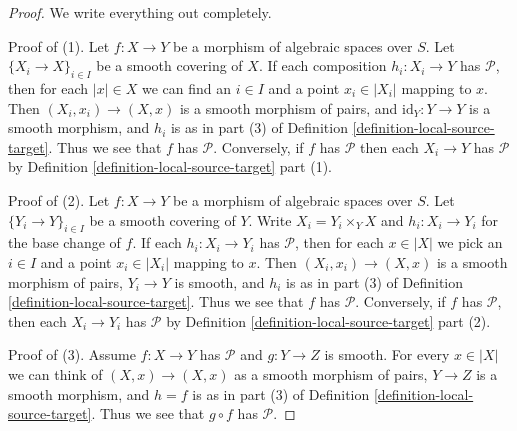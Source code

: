 \documentclass[10pt,a4paper]{amsart}
\theoremstyle{plain}
\theoremstyle{definition}
\theoremstyle{remark}
\numberwithin{equation}{subsection}
\begin{document}
\begin{proof}
We write everything out completely.

\medskip\noindent
Proof of (1). Let $f : X \to Y$ be a morphism of algebraic spaces over $S$.
Let $\{X_i \to X\}_{i \in I}$ be a smooth covering of $X$. If each composition
$h_i : X_i \to Y$ has $\mathcal{P}$, then for each $|x| \in X$ we can find
an $i \in I$ and a point $x_i \in |X_i|$ mapping to $x$. Then
$(X_i, x_i) \to (X, x)$ is a smooth morphism of pairs, and
$\text{id}_Y : Y \to Y$ is a smooth morphism, and $h_i$ is as in part (3) of
Definition \ref{definition-local-source-target}.
Thus we see that $f$ has $\mathcal{P}$.
Conversely, if $f$ has $\mathcal{P}$ then each $X_i \to Y$ has
$\mathcal{P}$ by
Definition \ref{definition-local-source-target} part (1).

\medskip\noindent
Proof of (2). Let $f : X \to Y$ be a morphism of algebraic spaces over $S$.
Let $\{Y_i \to Y\}_{i \in I}$ be a smooth covering of $Y$.
Write $X_i = Y_i \times_Y X$ and $h_i : X_i \to Y_i$ for the base change
of $f$.  If each  $h_i : X_i \to Y_i$ has $\mathcal{P}$, then for each
$x \in |X|$ we pick an $i \in I$ and a point $x_i \in |X_i|$ mapping to $x$.
Then $(X_i, x_i) \to (X, x)$ is a smooth morphism of pairs, $Y_i \to Y$ is
smooth, and $h_i$ is as in part (3) of
Definition \ref{definition-local-source-target}.
Thus we see that $f$ has $\mathcal{P}$.
Conversely, if $f$ has $\mathcal{P}$, then each $X_i \to Y_i$ has
$\mathcal{P}$ by
Definition \ref{definition-local-source-target} part (2).

\medskip\noindent
Proof of (3). Assume $f : X \to Y$ has $\mathcal{P}$ and $g : Y \to Z$ is
smooth. For every $x \in |X|$ we can think of $(X, x) \to (X, x)$ as a
smooth morphism of pairs, $Y \to Z$ is a smooth morphism, and $h = f$ is as
in part (3) of
Definition \ref{definition-local-source-target}.
Thus we see that $g \circ f$ has $\mathcal{P}$.
\end{proof}
\end{document}
